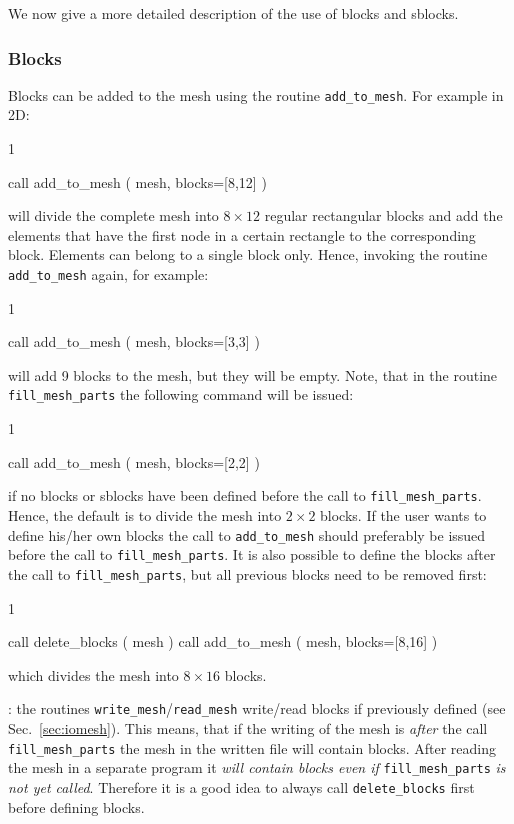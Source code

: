 We now give a more detailed description of the use of blocks and sblocks.

\subsubsection{Blocks}

Blocks can be added to the mesh
using the routine \texttt{add\_to\_mesh}. For example in 2D:
\begin{listing}{1}

  call add_to_mesh ( mesh, blocks=[8,12] )

\end{listing}
will divide the complete mesh into $8\times12$ regular rectangular blocks and
add the
elements that have the first node in a certain rectangle to the corresponding
block. Elements can belong to a single block only. Hence, invoking the
routine \texttt{add\_to\_mesh} again, for example:
\begin{listing}{1}

  call add_to_mesh ( mesh, blocks=[3,3] )

\end{listing}
will add 9 blocks to the mesh, but they will be empty. Note, that in 
the routine \texttt{fill\_mesh\_parts} the following command will be issued:
\begin{listing}{1}

  call add_to_mesh ( mesh, blocks=[2,2] )

\end{listing}
if no blocks or sblocks
have been defined before the call to \texttt{fill\_mesh\_parts}.
Hence, the default is to divide the mesh into $2\times2$ blocks. If the user
wants to define his/her own blocks the call to \texttt{add\_to\_mesh}
should preferably be issued before the call to \texttt{fill\_mesh\_parts}.
It is also possible to define the blocks after the call to
\texttt{fill\_mesh\_parts}, but all previous blocks need to be removed first:
\begin{listing}{1}

  call delete_blocks ( mesh )
  call add_to_mesh ( mesh, blocks=[8,16] )

\end{listing}
which divides the mesh into $8\times16$ blocks.

: the routines \texttt{write\_mesh}/\texttt{read\_mesh} write/read 
blocks if previously defined (see Sec.~\ref{sec:iomesh}). This means, that if
the writing of the mesh is \emph{after} the call \texttt{fill\_mesh\_parts} 
the mesh in the written file will contain blocks. After reading the mesh in
a separate program it \emph{will contain blocks even if}
\texttt{fill\_mesh\_parts} \emph{is not yet called}. Therefore it is a good idea
to always call \texttt{delete\_blocks} first before defining blocks.

